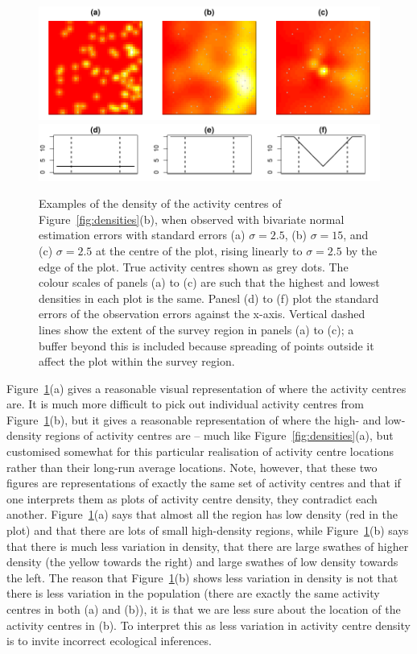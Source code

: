 \documentclass[10pt,a4paper]{article}
\begin{document}
\begin{figure}[htbp]
\centering
\includegraphics[width=\textwidth]{acesterr.pdf}
\includegraphics[width=\textwidth]{sigmas.pdf}
\caption{Examples of the density of the activity centres of Figure~\ref{fig:densities}(b), when observed with bivariate normal estimation errors with standard errors (a) $\sigma=2.5$, (b) $\sigma=15$, and (c) $\sigma=2.5$ at the centre of the plot, rising linearly to $\sigma=2.5$ by the edge of the plot. True activity centres shown as grey dots. The colour scales of panels (a) to (c) are such that the highest and lowest densities in each plot is the same.
Panesl (d) to (f) plot the standard errors of the observation errors against the x-axis. Vertical dashed lines show the extent of the survey region in panels (a) to (c); a buffer beyond this is included because spreading of points outside it affect the plot within the survey region.}
\label{fig:acesterr}
\end{figure}

Figure~\ref{fig:acesterr}(a) gives a reasonable visual representation of where the activity centres are. It is much more difficult to pick out individual activity centres from Figure~\ref{fig:acesterr}(b), but it gives a reasonable representation of where the high- and low-density regions of activity centres are -- much like Figure~\ref{fig:densities}(a), but customised somewhat for this particular realisation of activity centre locations rather than their long-run average locations. Note, however, that these two figures are representations of exactly the same set of activity centres and that if one interprets them as plots of activity centre density, they contradict each another. Figure~\ref{fig:acesterr}(a) says that almost all the region has low density (red in the plot) and that there are lots of small high-density regions, while Figure~\ref{fig:acesterr}(b) says that there is much less variation in density, that there are large swathes of higher density (the yellow towards the right) and large swathes of low density towards the left. The reason that Figure~\ref{fig:acesterr}(b) shows less variation in density is not that there is less variation in the population (there are exactly the same activity centres in both (a) and (b)), it is that we are less sure about the location of the activity centres in (b). To interpret this as less variation in activity centre density is to invite incorrect ecological inferences.
\end{document}
